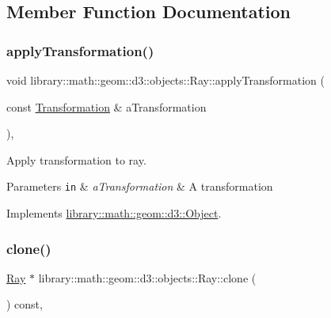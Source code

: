 \subsection{Member Function Documentation}
\mbox{\label{classlibrary_1_1math_1_1geom_1_1d3_1_1objects_1_1_ray_a0dd177a924978e1817a9fa888594e694}} 
\subsubsection{\texorpdfstring{apply\+Transformation()}{applyTransformation()}}
{\footnotesize\ttfamily void library\+::math\+::geom\+::d3\+::objects\+::\+Ray\+::apply\+Transformation (\begin{DoxyParamCaption}\item[{const \hyperlink{classlibrary_1_1math_1_1geom_1_1d3_1_1_transformation}{Transformation} \&}]{a\+Transformation }\end{DoxyParamCaption})\hspace{0.3cm}{\ttfamily [override]}, {\ttfamily [virtual]}}



Apply transformation to ray. 


\begin{DoxyParams}[1]{Parameters}
\mbox{\tt in}  & {\em a\+Transformation} & A transformation \\
\hline
\end{DoxyParams}


Implements \hyperlink{classlibrary_1_1math_1_1geom_1_1d3_1_1_object_a5fc47b1ee5d9a28efc6010d3d1512470}{library\+::math\+::geom\+::d3\+::\+Object}.

\mbox{\label{classlibrary_1_1math_1_1geom_1_1d3_1_1objects_1_1_ray_a247ea36c39c3b44d003b157689850ae4}} 
\subsubsection{\texorpdfstring{clone()}{clone()}}
{\footnotesize\ttfamily \hyperlink{classlibrary_1_1math_1_1geom_1_1d3_1_1objects_1_1_ray}{Ray} $\ast$ library\+::math\+::geom\+::d3\+::objects\+::\+Ray\+::clone (\begin{DoxyParamCaption}{ }\end{DoxyParamCaption}) const\hspace{0.3cm}{\ttfamily [override]}, {\ttfamily [virtual]}}



